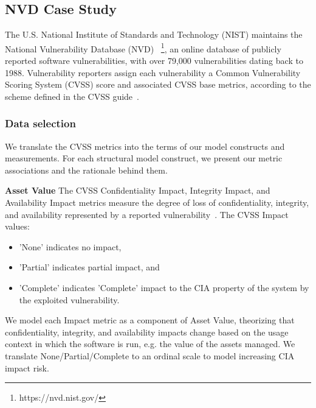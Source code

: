 \subsection{NVD Case Study}
\label{sec:evaluation_nvd}
The U.S. National Institute of Standards and Technology (NIST) maintains the National Vulnerability Database (NVD) ~\footnote{https://nvd.nist.gov/}, an online database of publicly reported software vulnerabilities, with over 79,000 vulnerabilities dating back to 1988. Vulnerability reporters assign each vulnerability a Common Vulnerability Scoring System (CVSS) score and associated CVSS base metrics, according to the scheme defined in the CVSS guide~\cite{mell2007complete}.  

\subsubsection{Data selection}
\label{sec:evaluation_nvd_selection}
 We translate the CVSS metrics into the terms of our model constructs and measurements. For each structural model construct, we present our metric associations and the rationale behind them.
 
\textbf{Asset Value}
The CVSS Confidentiality Impact, Integrity Impact, and Availability Impact metrics measure the degree of loss of confidentiality, integrity, and availability represented by a reported vulnerability~\cite{mell2007complete}. The CVSS Impact values:
	\begin{itemize}
		\item 'None' indicates no impact, 
		\item 'Partial' indicates partial impact, and 
		\item 'Complete' indicates 'Complete' impact to the CIA property of the system by the exploited vulnerability.  
	\end{itemize}
We model each Impact metric as a component of Asset Value, theorizing that confidentiality, integrity, and availability impacts change based on the usage context in which the software is run, e.g. the value of the assets managed. We translate None/Partial/Complete to an ordinal scale to model increasing CIA impact risk.

